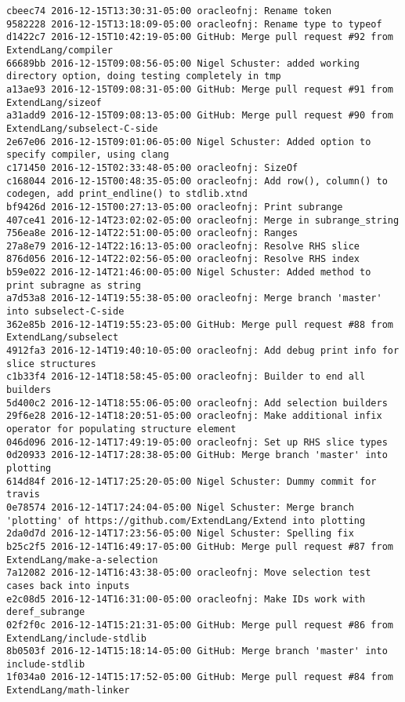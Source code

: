 \begin{lstlisting}
cbeec74 2016-12-15T13:30:31-05:00 oracleofnj: Rename token
9582228 2016-12-15T13:18:09-05:00 oracleofnj: Rename type to typeof
d1422c7 2016-12-15T10:42:19-05:00 GitHub: Merge pull request #92 from ExtendLang/compiler
66689bb 2016-12-15T09:08:56-05:00 Nigel Schuster: added working directory option, doing testing completely in tmp
a13ae93 2016-12-15T09:08:31-05:00 GitHub: Merge pull request #91 from ExtendLang/sizeof
a31add9 2016-12-15T09:08:13-05:00 GitHub: Merge pull request #90 from ExtendLang/subselect-C-side
2e67e06 2016-12-15T09:01:06-05:00 Nigel Schuster: Added option to specify compiler, using clang
c171450 2016-12-15T02:33:48-05:00 oracleofnj: SizeOf
c168044 2016-12-15T00:48:35-05:00 oracleofnj: Add row(), column() to codegen, add print_endline() to stdlib.xtnd
bf9426d 2016-12-15T00:27:13-05:00 oracleofnj: Print subrange
407ce41 2016-12-14T23:02:02-05:00 oracleofnj: Merge in subrange_string
756ea8e 2016-12-14T22:51:00-05:00 oracleofnj: Ranges
27a8e79 2016-12-14T22:16:13-05:00 oracleofnj: Resolve RHS slice
876d056 2016-12-14T22:02:56-05:00 oracleofnj: Resolve RHS index
b59e022 2016-12-14T21:46:00-05:00 Nigel Schuster: Added method to print subragne as string
a7d53a8 2016-12-14T19:55:38-05:00 oracleofnj: Merge branch 'master' into subselect-C-side
362e85b 2016-12-14T19:55:23-05:00 GitHub: Merge pull request #88 from ExtendLang/subselect
4912fa3 2016-12-14T19:40:10-05:00 oracleofnj: Add debug print info for slice structures
c1b33f4 2016-12-14T18:58:45-05:00 oracleofnj: Builder to end all builders
5d400c2 2016-12-14T18:55:06-05:00 oracleofnj: Add selection builders
29f6e28 2016-12-14T18:20:51-05:00 oracleofnj: Make additional infix operator for populating structure element
046d096 2016-12-14T17:49:19-05:00 oracleofnj: Set up RHS slice types
0d20933 2016-12-14T17:28:38-05:00 GitHub: Merge branch 'master' into plotting
614d84f 2016-12-14T17:25:20-05:00 Nigel Schuster: Dummy commit for travis
0e78574 2016-12-14T17:24:04-05:00 Nigel Schuster: Merge branch 'plotting' of https://github.com/ExtendLang/Extend into plotting
2da0d7d 2016-12-14T17:23:56-05:00 Nigel Schuster: Spelling fix
b25c2f5 2016-12-14T16:49:17-05:00 GitHub: Merge pull request #87 from ExtendLang/make-a-selection
7a12082 2016-12-14T16:43:38-05:00 oracleofnj: Move selection test cases back into inputs
e2c08d5 2016-12-14T16:31:00-05:00 oracleofnj: Make IDs work with deref_subrange
02f2f0c 2016-12-14T15:21:31-05:00 GitHub: Merge pull request #86 from ExtendLang/include-stdlib
8b0503f 2016-12-14T15:18:14-05:00 GitHub: Merge branch 'master' into include-stdlib
1f034a0 2016-12-14T15:17:52-05:00 GitHub: Merge pull request #84 from ExtendLang/math-linker

\end{lstlisting}
